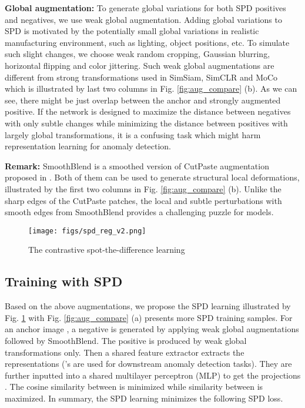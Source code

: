 \documentclass[runningheads]{llncs}
\begin{document}
\noindent\textbf{Global augmentation:} To generate global variations for both SPD positives and negatives, we use weak global augmentation. Adding global variations to SPD is motivated by the potentially small global variations in realistic manufacturing environment, such as lighting, object positions, etc. To simulate such slight changes, we choose weak random cropping, Gaussian blurring, horizontal flipping and color jittering. Such weak global augmentations are different from strong transformations used in SimSiam, SimCLR and MoCo which is illustrated by last two columns in Fig. \ref{fig:aug_compare} (b). As we can see, there might be just  overlap between the anchor and strongly augmented positive. If the network is designed to maximize the distance between negatives with only subtle changes while minimizing the distance between positives with largely global transformations, it is a confusing task which might harm representation learning for anomaly detection.

\noindent\textbf{Remark:} SmoothBlend is a smoothed version of CutPaste augmentation proposed in \cite{li2021cutpaste}. Both of them can be used to generate structural local deformations, illustrated by the first two columns in Fig. \ref{fig:aug_compare} (b). Unlike the sharp edges of the CutPaste patches, the local and subtle perturbations with smooth edges from SmoothBlend provides a challenging puzzle for models. 
\begin{figure}[!t]
 \centering
\texttt{[image: figs/spd\_reg\_v2.png]}
\caption{The contrastive spot-the-difference learning}
\label{fig:spd_reg}
\end{figure}
\subsection{Training with SPD}
Based on the above augmentations, we propose the SPD learning illustrated by Fig. \ref{fig:spd_reg} with Fig. \ref{fig:aug_compare} (a) presents more SPD training samples. For an anchor image , a negative  is generated by applying weak global augmentations followed by SmoothBlend. The positive   is produced by weak global transformations only. Then a shared feature extractor  extracts the representations  ('s are used for downstream anomaly detection tasks). They are further inputted into a shared multilayer perceptron (MLP)  to get the projections . The cosine similarity between  is minimized while similarity between  is maximized. In summary, the SPD learning minimizes the following SPD loss. 
\end{document}
